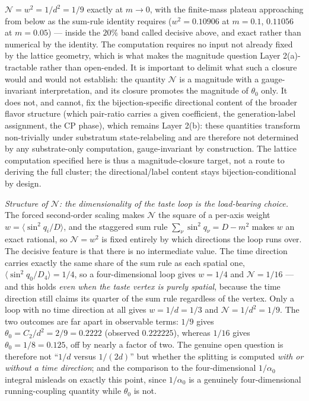 \documentclass[
]{article}
\begin{document}
\(\mathcal{N} = w^2 = 1/d^2 = 1/9\) exactly at \(m \to 0\), with the
finite-mass plateau approaching from below as the sum-rule identity
requires (\(w^2 = 0.10906\) at \(m = 0.1\), \(0.11056\) at \(m = 0.05\))
--- inside the \(20\%\) band called decisive above, and exact rather
than numerical by the identity. The computation requires no input not
already fixed by the lattice geometry, which is what makes the magnitude
question Layer 2(a)-tractable rather than open-ended. It is important to
delimit what such a closure would and would not establish: the quantity
\(\mathcal{N}\) is a magnitude with a gauge-invariant interpretation,
and its closure promotes the magnitude of \(\theta_0\) only. It does
not, and cannot, fix the bijection-specific directional content of the
broader flavor structure (which pair-ratio carries a given coefficient,
the generation-label assignment, the CP phase), which remains Layer
2(b): these quantities transform non-trivially under substratum
state-relabeling and are therefore not determined by any substrate-only
computation, gauge-invariant by construction. The lattice computation
specified here is thus a magnitude-closure target, not a route to
deriving the full cluster; the directional/label content stays
bijection-conditional by design.

\emph{Structure of \(\mathcal{N}\): the dimensionality of the taste loop
is the load-bearing choice.} The forced second-order scaling makes
\(\mathcal{N}\) the square of a per-axis weight
\(w = \langle \sin^2 q_i / D \rangle\), and the staggered sum rule
\(\sum_\nu \sin^2 q_\nu = D - m^2\) makes \(w\) an exact rational, so
\(\mathcal{N} = w^2\) is fixed entirely by which directions the loop
runs over. The decisive feature is that there is no intermediate value.
The time direction carries exactly the same share of the sum rule as
each spatial one, \(\langle \sin^2 q_0 / D_4 \rangle = 1/4\), so a
four-dimensional loop gives \(w = 1/4\) and \(\mathcal{N} = 1/16\) ---
and this holds \emph{even when the taste vertex is purely spatial},
because the time direction still claims its quarter of the sum rule
regardless of the vertex. Only a loop with no time direction at all
gives \(w = 1/d = 1/3\) and \(\mathcal{N} = 1/d^2 = 1/9\). The two
outcomes are far apart in observable terms: \(1/9\) gives
\(\theta_0 = C_2/d^2 = 2/9 = 0.2222\) (observed \(0.222225\)), whereas
\(1/16\) gives \(\theta_0 = 1/8 = 0.125\), off by nearly a factor of
two. The genuine open question is therefore not ``\(1/d\) versus
\(1/(2d)\)'' but whether the splitting is computed \emph{with or without
a time direction}; and the comparison to the four-dimensional
\(1/\alpha_0\) integral misleads on exactly this point, since
\(1/\alpha_0\) is a genuinely four-dimensional running-coupling quantity
while \(\theta_0\) is not.
\end{document}
